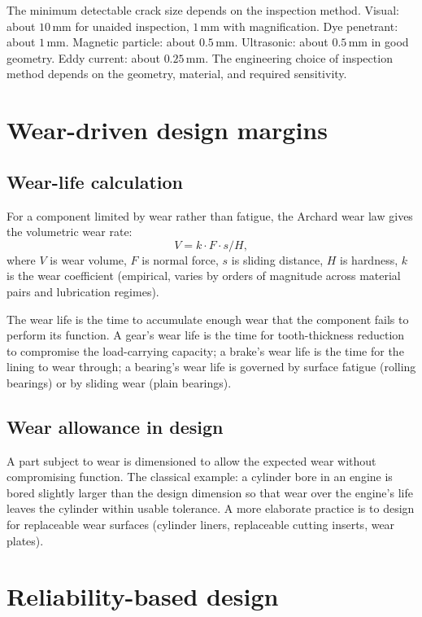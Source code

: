 The minimum detectable crack size depends on the inspection method. Visual: about $10\,\si{\milli\meter}$ for unaided inspection, $1\,\si{\milli\meter}$ with magnification. Dye penetrant: about $1\,\si{\milli\meter}$. Magnetic particle: about $0.5\,\si{\milli\meter}$. Ultrasonic: about $0.5\,\si{\milli\meter}$ in good geometry. Eddy current: about $0.25\,\si{\milli\meter}$. The engineering choice of inspection method depends on the geometry, material, and required sensitivity.

\section{Wear-driven design margins}

\subsection{Wear-life calculation}

For a component limited by wear rather than fatigue, the Archard wear law gives the volumetric wear rate:
\[
V = k \cdot F \cdot s / H,
\]
where $V$ is wear volume, $F$ is normal force, $s$ is sliding distance, $H$ is hardness, $k$ is the wear coefficient (empirical, varies by orders of magnitude across material pairs and lubrication regimes).

The wear life is the time to accumulate enough wear that the component fails to perform its function. A gear's wear life is the time for tooth-thickness reduction to compromise the load-carrying capacity; a brake's wear life is the time for the lining to wear through; a bearing's wear life is governed by surface fatigue (rolling bearings) or by sliding wear (plain bearings).

\subsection{Wear allowance in design}

A part subject to wear is dimensioned to allow the expected wear without compromising function. The classical example: a cylinder bore in an engine is bored slightly larger than the design dimension so that wear over the engine's life leaves the cylinder within usable tolerance. A more elaborate practice is to design for replaceable wear surfaces (cylinder liners, replaceable cutting inserts, wear plates).

\section{Reliability-based design}

